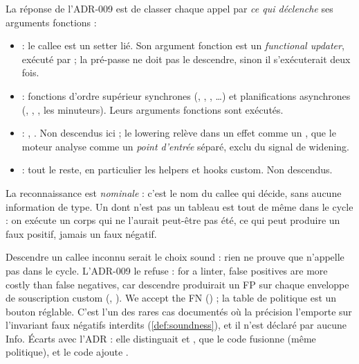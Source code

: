 La réponse de l'ADR-009 est de classer chaque appel par \emph{ce qui
déclenche} ses arguments fonctions :


\begin{itemize}
  \item {} : le callee est un setter lié. Son argument fonction
    est un \emph{functional updater}, exécuté par  ;
    la pré-passe ne doit pas le descendre, sinon il s'exécuterait deux fois.
  \item {} : fonctions d'ordre supérieur synchrones (,
    , , \ldots) et planifications
    asynchrones (, , , les minuteurs).
    Leurs arguments fonctions sont exécutés.
  \item {} : ,
    . Non descendus ici ; le lowering relève
     dans un effet comme un
    , que le moteur analyse comme un \emph{point
    d'entrée} séparé, exclu du signal de widening.
  \item {} : tout le reste, en particulier les helpers et hooks
    custom. Non descendus.
\end{itemize}

La reconnaissance est \emph{nominale} : c'est le nom du callee qui décide,
sans aucune information de type. Un  dont  n'est pas
un tableau est tout de même \og dans le cycle\fg{} : on exécute un corps qui
ne l'aurait peut-être pas été, ce qui peut produire un faux positif, jamais
un faux négatif.

\begin{decision}
  Descendre un callee inconnu serait le choix sound : rien ne prouve que
   n'appelle pas  dans le cycle. L'ADR-009 le
  refuse : \og for a linter, false positives are more costly than false
  negatives\fg{}, car descendre produirait un FP sur chaque enveloppe de
  souscription custom (, ).
  \og We accept the FN\fg{} () ; la table de politique est un
  bouton réglable. C'est l'un des rares cas documentés où la précision
  l'emporte sur l'invariant \og faux négatifs interdits\fg{}
  (\cref{def:soundness}), et il n'est déclaré par aucune Info. Écarts avec
  l'ADR : elle distinguait  et ,
  que le code fusionne (même politique), et le code ajoute .
\end{decision}

